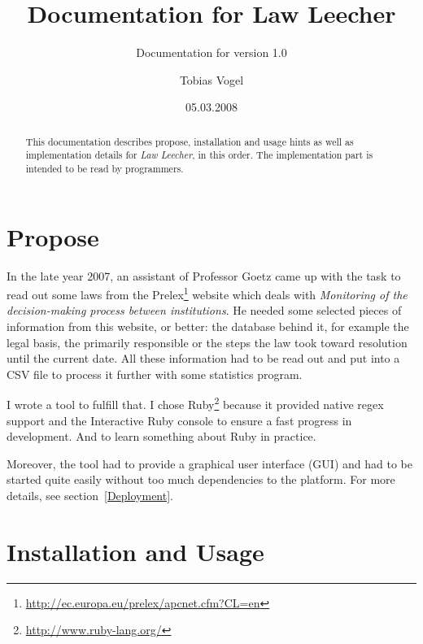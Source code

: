 \documentclass{scrartcl}
\title{Documentation for Law Leecher}
\subtitle{Documentation for version 1.0}
\author{Tobias Vogel}
\date{05.03.2008}
\begin{document}
\maketitle

\begin{abstract}
This documentation describes propose, installation and usage hints as well as implementation details for \textit{Law Leecher}, in this order. The implementation part is intended to be read by programmers.
\end{abstract}


\tableofcontents

\section{Propose}
In the late year 2007, an assistant of Professor Goetz came up with the task to read out some laws from the Prelex\footnote{\url{http://ec.europa.eu/prelex/apcnet.cfm?CL=en}} website which deals with \textit{Monitoring of the decision-making process between institutions}. He needed some selected pieces of information from this website, or better: the database behind it, for example the legal basis, the primarily responsible or the steps the law took toward resolution until the current date. All these information had to be read out and put into a CSV file to process it further with some statistics program.

I wrote a tool to fulfill that. I chose Ruby\footnote{\url{http://www.ruby-lang.org/}} because it provided native regex support and the Interactive Ruby console to ensure a fast progress in development. And to learn something about Ruby in practice.

Moreover, the tool had to provide a graphical user interface (GUI) and had to be started quite easily without too much dependencies to the platform. For more details, see section~\ref{Deployment}.



\section{Installation and Usage}
\end{document}
